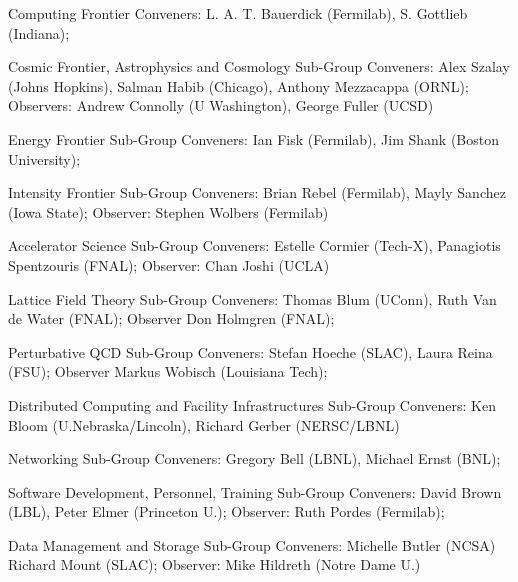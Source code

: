 

\begin{center}

\begin{large} {Computing Frontier Conveners: L. A. T. Bauerdick (Fermilab), S. Gottlieb (Indiana);

Cosmic Frontier, Astrophysics and Cosmology Sub-Group Conveners:
Alex Szalay (Johns Hopkins), Salman Habib (Chicago), Anthony Mezzacappa (ORNL); 
Observers: Andrew Connolly (U Washington), George Fuller (UCSD)

Energy Frontier Sub-Group Conveners: 
Ian Fisk (Fermilab), Jim Shank (Boston University);

Intensity Frontier Sub-Group Conveners: 
Brian Rebel (Fermilab), Mayly Sanchez (Iowa State);
Observer: Stephen Wolbers (Fermilab)

Accelerator Science Sub-Group Conveners: 
Estelle Cormier (Tech-X), Panagiotis Spentzouris (FNAL); 
Observer: Chan Joshi (UCLA)

Lattice Field Theory Sub-Group Conveners: 
Thomas Blum (UConn), Ruth Van de Water (FNAL); 
Observer Don Holmgren (FNAL);

Perturbative QCD Sub-Group Conveners: 
Stefan Hoeche (SLAC), Laura Reina (FSU); 
Observer Markus Wobisch (Louisiana Tech);

Distributed Computing and Facility Infrastructures Sub-Group Conveners: 
Ken Bloom (U.Nebraska/Lincoln), Richard Gerber (NERSC/LBNL)

Networking Sub-Group Conveners: 
Gregory Bell (LBNL), Michael Ernst (BNL);

Software Development, Personnel, Training Sub-Group Conveners: 
David Brown (LBL), Peter Elmer (Princeton U.);
Observer: Ruth Pordes (Fermilab);

Data Management and Storage Sub-Group Conveners: 
Michelle Butler (NCSA) Richard Mount (SLAC); 
Observer: Mike Hildreth (Notre Dame U.)

} \end{large}

 

\end{center}

